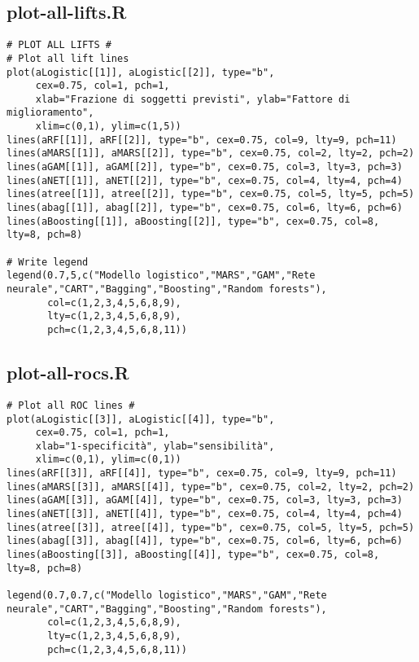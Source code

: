\subsection{plot-all-lifts.R}\label{sec:script-plot-all-lifts}
\begin{verbatim}
# PLOT ALL LIFTS #
# Plot all lift lines
plot(aLogistic[[1]], aLogistic[[2]], type="b", 
     cex=0.75, col=1, pch=1,
     xlab="Frazione di soggetti previsti", ylab="Fattore di miglioramento",
     xlim=c(0,1), ylim=c(1,5))
lines(aRF[[1]], aRF[[2]], type="b", cex=0.75, col=9, lty=9, pch=11)
lines(aMARS[[1]], aMARS[[2]], type="b", cex=0.75, col=2, lty=2, pch=2)
lines(aGAM[[1]], aGAM[[2]], type="b", cex=0.75, col=3, lty=3, pch=3)
lines(aNET[[1]], aNET[[2]], type="b", cex=0.75, col=4, lty=4, pch=4)
lines(atree[[1]], atree[[2]], type="b", cex=0.75, col=5, lty=5, pch=5)
lines(abag[[1]], abag[[2]], type="b", cex=0.75, col=6, lty=6, pch=6)
lines(aBoosting[[1]], aBoosting[[2]], type="b", cex=0.75, col=8, lty=8, pch=8)

# Write legend
legend(0.7,5,c("Modello logistico","MARS","GAM","Rete neurale","CART","Bagging","Boosting","Random forests"),
       col=c(1,2,3,4,5,6,8,9),
       lty=c(1,2,3,4,5,6,8,9),
       pch=c(1,2,3,4,5,6,8,11))
\end{verbatim}

\subsection{plot-all-rocs.R}\label{sec:script-plot-all-rocs}
\begin{verbatim}
# Plot all ROC lines #
plot(aLogistic[[3]], aLogistic[[4]], type="b", 
     cex=0.75, col=1, pch=1,
     xlab="1-specificità", ylab="sensibilità",
     xlim=c(0,1), ylim=c(0,1))
lines(aRF[[3]], aRF[[4]], type="b", cex=0.75, col=9, lty=9, pch=11)
lines(aMARS[[3]], aMARS[[4]], type="b", cex=0.75, col=2, lty=2, pch=2)
lines(aGAM[[3]], aGAM[[4]], type="b", cex=0.75, col=3, lty=3, pch=3)
lines(aNET[[3]], aNET[[4]], type="b", cex=0.75, col=4, lty=4, pch=4)
lines(atree[[3]], atree[[4]], type="b", cex=0.75, col=5, lty=5, pch=5)
lines(abag[[3]], abag[[4]], type="b", cex=0.75, col=6, lty=6, pch=6)
lines(aBoosting[[3]], aBoosting[[4]], type="b", cex=0.75, col=8, lty=8, pch=8)

legend(0.7,0.7,c("Modello logistico","MARS","GAM","Rete neurale","CART","Bagging","Boosting","Random forests"),
       col=c(1,2,3,4,5,6,8,9),
       lty=c(1,2,3,4,5,6,8,9),
       pch=c(1,2,3,4,5,6,8,11))
\end{verbatim}
